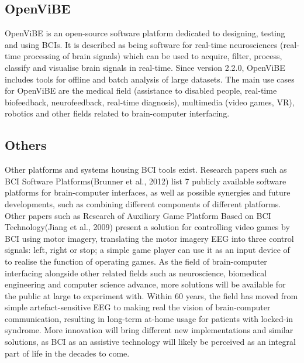 \subsection{OpenViBE}
OpenViBE is an open-source software platform dedicated to designing, testing and using BCIs. It is described as being software for real-time neurosciences (real-time processing of brain signals) which can be used to acquire, filter, process, classify and visualise brain signals in real-time. Since version 2.2.0, OpenViBE includes tools for offline and batch analysis of large datasets. The main use cases for OpenViBE are the medical field (assistance to disabled people, real-time biofeedback, neurofeedback, real-time diagnosis), multimedia (video games, VR), robotics and other fields related to brain-computer interfacing.

\subsection{Others}
Other platforms and systems housing BCI tools exist. Research papers such as BCI Software Platforms(Brunner et al., 2012) list 7 publicly available software platforms for brain-computer interfaces, as well as possible synergies and future developments, such as combining different components of different platforms\cite{Brunner_2012}. Other papers such as Research of Auxiliary Game Platform Based on BCI Technology(Jiang et al., 2009) present a solution for controlling video games by BCI using motor imagery, translating the motor imagery EEG into three control signals: left, right or stop; a simple game player can use it as an input device of to realise the function of operating games\cite{Jiang_2009}.
\vspace{\baselineskip}\newline
As the field of brain-computer interfacing alongside other related fields such as neuroscience, biomedical engineering and computer science advance, more solutions will be available for the public at large to experiment with. Within 60 years, the field has moved from simple artefact-sensitive EEG to making real the vision of brain-computer communication, resulting in long-term at-home usage for patients with locked-in syndrome\cite{K_bler_2019}. More innovation will bring different new implementations and similar solutions, as BCI as an assistive technology will likely be perceived as an integral part of life in the decades to come\cite{K_bler_2019}.

\newpage

